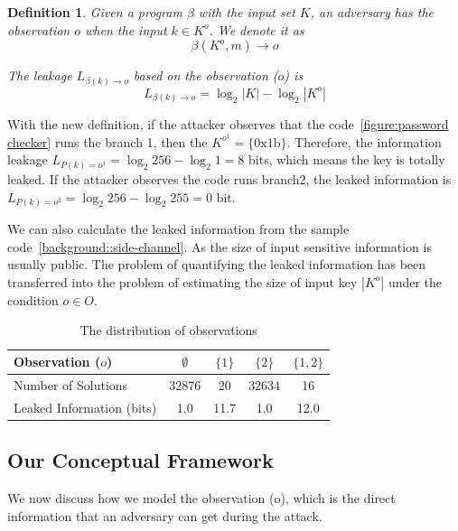 \newtheorem{mydef}{Definition}

\begin{mydef}
\label{def}
Given a program $\beta$ with the input set $K$, 
an adversary has the observation $o$ when the input $k{\in}K^o$. 
We denote it as
$$\beta(K^o, m) \rightarrow	o$$

The leakage $L_{\beta(k)\rightarrow o}$ based on the observation ($o$) is
    $$L_{\beta(k)\rightarrow o} = \log_2{|K|} - \log_2{|K^o|}$$
\end{mydef}

With the new definition, if the attacker observes that the code~\ref{figure:password checker} runs the branch 1, 
then the $K^{o^{1}} = \{\mathrm{0x1b}\}$. Therefore, the information leakage $L_{P(k)=o^{1}} = \log_2{256} - \log_2{1} = 8$
bits, which means the key is totally leaked. If the attacker observes the code runs branch2, the leaked information is 
$L_{P(k)=o^{2}} = \log_2{256} - \log_2{255} = 0$ bit.


We can also calculate the leaked information
from the sample code~\ref{background::side-channel}. As the size of input 
sensitive information is usually public. The problem of quantifying the
leaked information has been transferred into the problem of estimating
the size of input key $|K^o|$ under the condition $o \in O$.

\begin{table}[ht]
    \centering


\begin{tabular}{l|cccc}
    \hline
Observation ($o$)  & $\emptyset$ & ${\{1\}}$ & ${\{2\}}$ & ${\{1, 2\}}$ \\ \hline
Number of Solutions &  32876 & 20 & 32634 & 16 \\ \hline
Leaked Information (bits)     & 1.0 & 11.7 & 1.0  & 12.0   \\
    \hline
\end{tabular}
\caption{The distribution of observations}
\label{shtable}
\end{table}

\subsection{Our Conceptual Framework}
We now discuss how we model the observation (o), which is the direct information
that an adversary can get during the attack.

